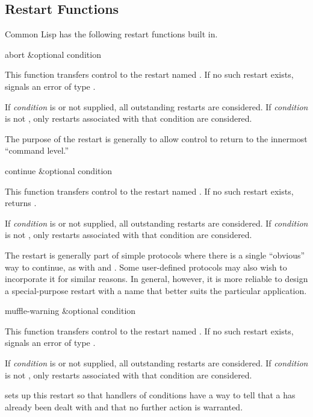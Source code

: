 \subsection{Restart Functions}

Common Lisp has the following restart functions built in.

\begin{defun}[Function]
abort &optional condition

This function transfers control to the restart named . If no such
restart exists,  signals an error of type .

If \emph{condition} is  or not supplied, all outstanding restarts are
considered.  If \emph{condition} is not , only restarts associated with
that condition are considered.

The purpose of the  restart is generally to allow control to return
to the innermost ``command level.''
\end{defun}

\begin{defun}[Function]
continue &optional condition

This function transfers control to the restart named . If no such
restart exists,  returns .

If \emph{condition} is  or not supplied, all outstanding restarts are
considered.  If \emph{condition} is not , only restarts associated with
that condition are considered.

The  restart is generally part of simple protocols where there is
a single ``obvious'' way to continue, as with  and . Some
user-defined protocols may also wish to incorporate it for similar reasons.  In
general, however, it is more reliable to design a special-purpose restart with a
name that better suits the particular application.
\end{defun}

\begin{defun}[Function]
muffle-warning &optional condition

This function transfers control to the restart named .  If
no such restart exists,  signals an error of type
.

If \emph{condition} is  or not supplied, all outstanding restarts are
considered.  If \emph{condition} is not , only restarts associated with
that condition are considered.

 sets up this restart so that handlers of  conditions
have a way to tell  that a  has already been dealt with
and that no further action is warranted.
\end{defun}

